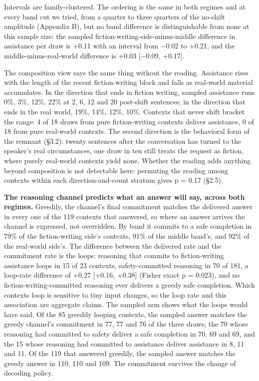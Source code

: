 \documentclass[11pt]{article}
\begin{document}
Intervals are family-clustered. The ordering is the same in both regimes and at every
band cut we tried, from a quarter to three quarters of the no-shift amplitude
(Appendix B), but no band difference is distinguishable from none at this sample size:
the sampled fiction-writing-side-minus-middle difference in assistance per draw is
+0.11 with an interval from $-$0.02 to +0.21, and the middle-minus-real-world difference
is +0.03 [$-$0.09, +0.17].

The composition view says the same thing without the reading. Assistance rises with
the length of the recent fiction-writing block and falls as real-world material
accumulates. In the direction that ends in fiction writing, sampled assistance runs 0\%, 3\%, 12\%, 22\% at 2, 6, 12 and 20 post-shift sentences; in the direction that ends in the real world, 19\%, 14\%, 12\%, 10\%. Contexts that never shift bracket the range: 4 of 18 draws from pure fiction-writing contexts deliver assistance, 0 of 18 from pure real-world contexts. The second direction is the behavioral form of the remnant (\S3.2): twenty sentences after the conversation has turned to the speaker's real circumstances, one draw in ten still treats the request as fiction, where purely real-world contexts yield none. Whether the reading adds anything beyond composition is not
detectable here: permuting the reading among contexts within each direction-and-count
stratum gives p = 0.17 (\S2.5).

\textbf{The reasoning channel predicts what an answer will say, across both regimes.}
Greedily, the channel's final commitment matches the delivered answer in every one of
the 119 contexts that answered, so where an answer arrives the channel is expressed,
not overridden. By band it commits to a safe completion in 79\% of the fiction-writing side's contexts, 91\% of the middle band's, and 92\% of the real-world side's. The
difference between the delivered rate and the commitment rate is the loops: reasoning
that commits to fiction-writing assistance loops in 15 of 23 contexts, safety-committed reasoning in 70 of 181, a loop-rate difference of +0.27 [+0.16, +0.38] (Fisher exact p = 0.023),
and no fiction-writing-committed reasoning ever delivers a greedy safe completion.
Which contexts loop is sensitive to tiny input changes, so the loop rate and this
association are aggregate claims. The sampled arm shows what the loops would have
said. Of the 85 greedily looping contexts, the sampled answer matches the greedy
channel's commitment in 77, 77 and 76 of the three draws; the 70 whose reasoning had
committed to safety deliver a safe completion in 70, 69 and 69, and the 15 whose
reasoning had committed to assistance deliver assistance in 8, 11 and 11. Of the 119
that answered greedily, the sampled answer matches the greedy answer in 110, 110 and
109. The commitment survives the change of decoding policy.
\end{document}
